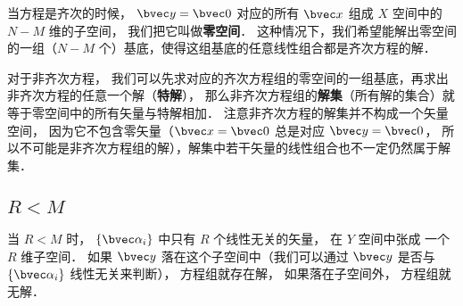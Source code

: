 
当方程是齐次的时候， $\bvec y = \bvec 0$ 对应的所有 $\bvec x$ 组成 $X$ 空间中的 $N- M$ 维的子空间， 我们把它叫做\textbf{零空间}． 这种情况下，我们希望能解出零空间的一组（$N - M$ 个）基底，使得这组基底的任意线性组合都是齐次方程的解．

对于非齐次方程， 我们可以先求对应的齐次方程组的零空间的一组基底，再求出非齐次方程的任意一个解（\textbf{特解}）， 那么非齐次方程组的\textbf{解集}（所有解的集合）就等于零空间中的所有矢量与特解相加． 注意非齐次方程的解集并不构成一个矢量空间， 因为它不包含零矢量（$\bvec x = \bvec 0$ 总是对应 $\bvec y = \bvec 0$， 所以不可能是非齐次方程组的解），解集中若干矢量的线性组合也不一定仍然属于解集．

\subsection{$R < M$}
当 $R < M$ 时， $\{\bvec \alpha_i\}$ 中只有 $R$ 个线性无关的矢量， 在 $Y$ 空间中张成%
一个 $R$ 维子空间． 如果 $\bvec y$ 落在这个子空间中（我们可以通过 $\bvec y$ 是否与 $\{\bvec \alpha_i\}$ 线性无关来判断）， 方程组就存在解， 如果落在子空间外， 方程组就无解．

